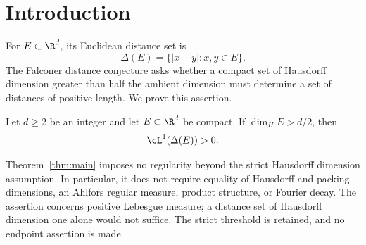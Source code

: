 \section{Introduction}\label{sec:introduction}

For \(E\subset\R^d\), its Euclidean distance set is
\[
 \Delta(E)=\{|x-y|:x,y\in E\}.
\]
The Falconer distance conjecture asks whether a compact set of Hausdorff
dimension greater than half the ambient dimension must determine a set
of distances of positive length. We prove this assertion.

\begin{theorem}\label{thm:main}
Let \(d\ge2\) be an integer and let \(E\subset\R^d\) be compact. If
\(\dim_H E>d/2\), then
\[
 \cL^1(\Delta(E))>0.
\]
\end{theorem}

Theorem~\ref{thm:main} imposes no regularity beyond the strict Hausdorff
dimension assumption. In particular, it does not require equality of
Hausdorff and packing dimensions, an Ahlfors regular measure, product
structure, or Fourier decay. The assertion concerns positive Lebesgue
measure; a distance set of Hausdorff dimension one alone would not
suffice. The strict threshold is retained, and no endpoint assertion is made.

